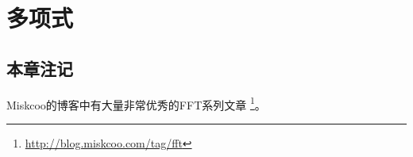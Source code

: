 \chapter{多项式}




\section{本章注记}
Miskcoo的博客中有大量非常优秀的FFT系列文章
\footnote{\url{http://blog.miskcoo.com/tag/fft}}。
